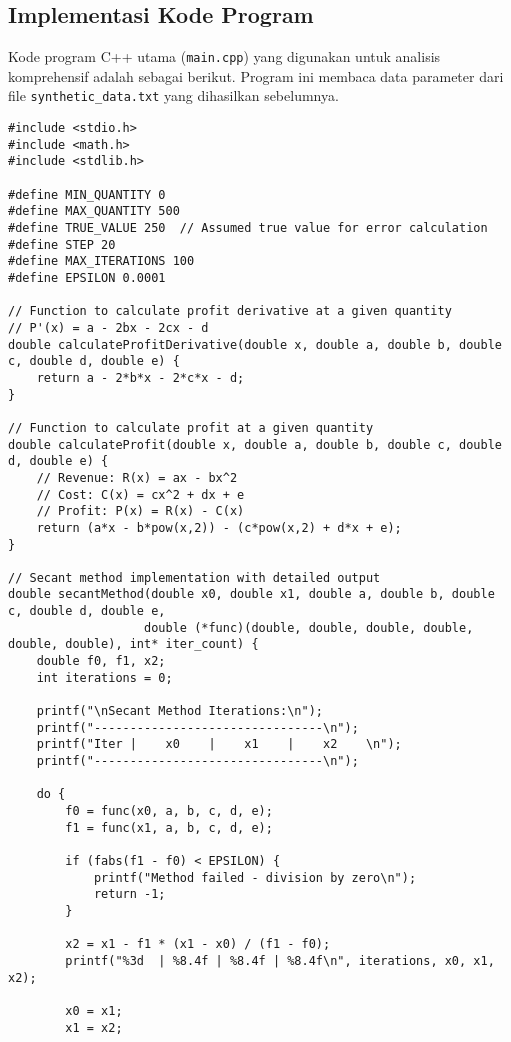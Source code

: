 \documentclass[conference]{IEEEtran}
\begin{document}
\subsection{Implementasi Kode Program}
Kode program C++ utama (\texttt{main.cpp}) yang digunakan untuk analisis komprehensif adalah sebagai berikut. Program ini membaca data parameter dari file \texttt{synthetic\_data.txt} yang dihasilkan sebelumnya.
\begingroup %
\tiny %
\begin{verbatim}
#include <stdio.h>
#include <math.h>
#include <stdlib.h>

#define MIN_QUANTITY 0
#define MAX_QUANTITY 500
#define TRUE_VALUE 250  // Assumed true value for error calculation
#define STEP 20
#define MAX_ITERATIONS 100
#define EPSILON 0.0001

// Function to calculate profit derivative at a given quantity
// P'(x) = a - 2bx - 2cx - d
double calculateProfitDerivative(double x, double a, double b, double c, double d, double e) {
    return a - 2*b*x - 2*c*x - d;
}

// Function to calculate profit at a given quantity
double calculateProfit(double x, double a, double b, double c, double d, double e) {
    // Revenue: R(x) = ax - bx^2
    // Cost: C(x) = cx^2 + dx + e
    // Profit: P(x) = R(x) - C(x)
    return (a*x - b*pow(x,2)) - (c*pow(x,2) + d*x + e);
}

// Secant method implementation with detailed output
double secantMethod(double x0, double x1, double a, double b, double c, double d, double e, 
                   double (*func)(double, double, double, double, double, double), int* iter_count) {
    double f0, f1, x2;
    int iterations = 0;
    
    printf("\nSecant Method Iterations:\n");
    printf("--------------------------------\n");
    printf("Iter |    x0    |    x1    |    x2    \n");
    printf("--------------------------------\n");
    
    do {
        f0 = func(x0, a, b, c, d, e);
        f1 = func(x1, a, b, c, d, e);
        
        if (fabs(f1 - f0) < EPSILON) {
            printf("Method failed - division by zero\n");
            return -1;
        }
        
        x2 = x1 - f1 * (x1 - x0) / (f1 - f0);
        printf("%3d  | %8.4f | %8.4f | %8.4f\n", iterations, x0, x1, x2);
        
        x0 = x1;
        x1 = x2;
        

\end{verbatim}
\end{document}
